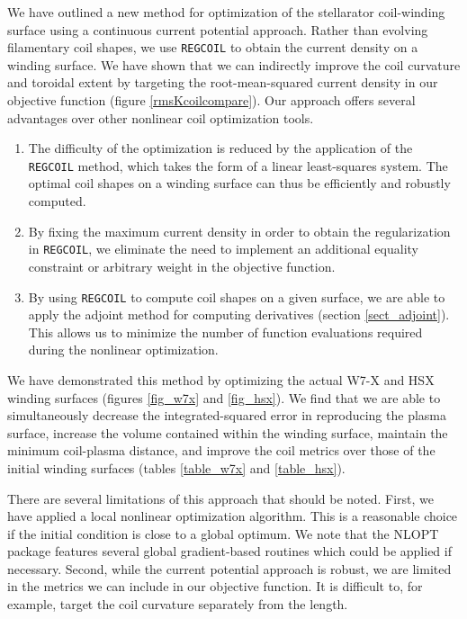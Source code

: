 \documentclass[aps,unsortedaddress]{revtex4-1}
\begin{document}
We have outlined a new method for optimization of the stellarator coil-winding surface using a continuous current potential approach. Rather than evolving filamentary coil shapes, we use \texttt{REGCOIL} to obtain the current density on a winding surface. We have shown that we can indirectly improve the coil curvature and toroidal extent by targeting the root-mean-squared current density in our objective function (figure \ref{rmsKcoilcompare}). Our approach offers several advantages over other nonlinear coil optimization tools.
\begin{enumerate}
\item The difficulty of the optimization is reduced by the application of the \texttt{REGCOIL} method, which takes the form of a linear least-squares system. The optimal coil shapes on a winding surface can thus be efficiently and robustly computed. 
\item By fixing the maximum current density in order to obtain the regularization in \texttt{REGCOIL}, we eliminate the need to implement an additional equality constraint or arbitrary weight in the objective function. 
\item By using \texttt{REGCOIL} to compute coil shapes on a given surface, we are able to apply the adjoint method for computing derivatives (section \ref{sect_adjoint}). This allows us to minimize the number of function evaluations required during the nonlinear optimization. 
\end{enumerate} 
We have demonstrated this method by optimizing the actual W7-X and HSX winding surfaces (figures \ref{fig_w7x} and \ref{fig_hsx}). We find that we are able to simultaneously decrease the integrated-squared error in reproducing the plasma surface, increase the volume contained within the winding surface, maintain the minimum coil-plasma distance, and improve the coil metrics over those of the initial winding surfaces (tables \ref{table_w7x} and \ref{table_hsx}). 

There are several limitations of this approach that should be noted. First, we have applied a local nonlinear optimization algorithm. This is a reasonable choice if the initial condition is close to a global optimum. We note that the NLOPT package features several global gradient-based routines which could be applied if necessary. Second, while the current potential approach is robust, we are limited in the metrics we can include in our objective function. It is difficult to, for example, target the coil curvature separately from the length.
\end{document}
